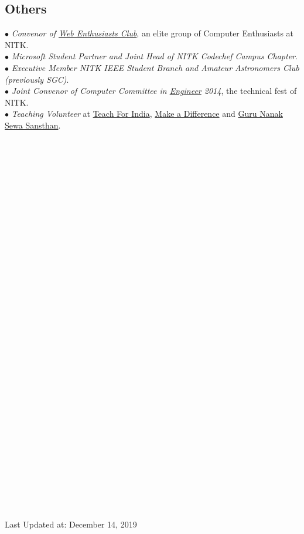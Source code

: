 \documentclass[margin,line]{resume}
\begin{document}
\begin{resume}
         
    \section{\mysidestyle \bf Others}
 $\bullet$ {\it Convenor of \href{https://webclub-nitk.github.io/}{Web Enthusiasts Club}}, an elite group of Computer Enthusiasts at NITK. \\
 $\bullet$ {\it Microsoft Student Partner and Joint Head of NITK Codechef Campus Chapter}. \\
     $\bullet$ {\it Executive Member NITK IEEE Student Branch and Amateur Astronomers Club (previously SGC)}. \\
     $\bullet$ {\it Joint Convenor of Computer Committee in \href{http://www.nitk.ac.in/students-activities/engineer}{Engineer} 2014}, the technical fest of NITK. \\
$\bullet$ {\it Teaching Volunteer} at \href{http://www.teachforindia.org/}{Teach For India}, \href{http://makeadiff.in/}{Make a Difference} and \href{https://www.nanakg.org/}{Guru Nanak Sewa Sansthan}.
    \\\\\\\\\\\\\\\\\\\\\\\\\\\\\\\\\\\\\\\\\\\\\\\\\\\\\\\\\\\\\\\\\\\\
\begin{footnotesize}
Last Updated at: December 14, 2019
\end{footnotesize}
\end{resume}
\end{document}
